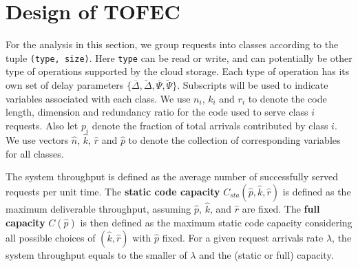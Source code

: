 \documentclass[journal]{IEEEtran}
\newcommand{\comment}[1]{}
\newcommand{\ourproposal}{TOFEC\xspace}
\newcommand{\lenVec}{\hat{n}}
\newcommand{\dimVec}{\hat{k}}
\newcommand{\compVec}{\hat{p}}
\newcommand{\rateVec}{\hat{r}}
\newcommand{\CapSta}{C_{sta}}
\newcommand{\CapFull}{C}
\newcommand{\fixedDelta}{\overline{\Delta}}
\newcommand{\linearDelta}{\widetilde{\Delta}}
\newcommand{\fixedExp}{\overline{\Psi}}
\newcommand{\linearExp}{\widetilde{\Psi}}
\begin{document}
\comment{
We assume there are $m\ge 1$ classes of requests. Requests of each class have identical file size  and all are divided into chunks of identical size. Under this assumption, service times of all chunks of the same class follow the same distribution and each class $i$ can be characterized by a three-tuple $(k_i,\Delta_i,\mu_i)$, where $\Delta_i$ and $\mu_i$ specifies the delay distribution of class-$i$ chunks.
Throughout this paper, we assume $k_i$'s (and accordingly chunk sizes) are determined a priori and $(\Delta_i,\mu_i)$ are given. Our focus will be on the adaptation/choice of $n_i$'s.  
}







\section{Design of \ourproposal}
\label{sec:proposed-algorithm}

For the analysis in this section, we group requests into classes according to the tuple {\tt (type, size)}. Here {\tt type} can be read or write, and can potentially be other type of operations supported by the cloud storage. Each type of operation has its own set of delay parameters $\{\fixedDelta, \linearDelta, \fixedExp, \linearExp\}$. Subscripts will be used to indicate variables associated with each class. We use $n_i$, $k_i$ and $r_i$ to denote the code length, dimension and redundancy ratio for the code used to serve class $i$ requests. Also let $p_i$ denote the fraction of total arrivals contributed by class $i$. We use vectors $\lenVec$, $\dimVec$, $\rateVec$ and $\compVec$ to denote the collection of corresponding variables for all classes. 

The system throughput is defined as the average number of successfully served requests per unit time. The {\bf static code capacity} $\CapSta(\compVec,\dimVec,\rateVec)$  is defined as the maximum deliverable throughput, assuming $\compVec$, $\dimVec$, and $\rateVec$ are fixed. The {\bf full capacity} $\CapFull(\compVec)$ is then defined as the maximum static code capacity considering all possible choices of $(\dimVec,\rateVec)$ with $\compVec$ fixed. For a given request arrivals rate $\lambda$, the system throughput equals to the smaller of $\lambda$ and the (static or full) capacity.
\end{document}
